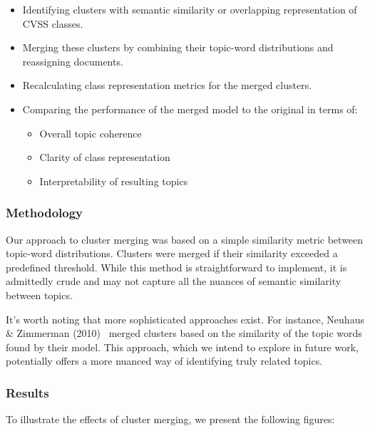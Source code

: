 \documentclass[12pt]{article}
\begin{document}
\begin{itemize}
	\item Identifying clusters with semantic similarity or overlapping representation of CVSS classes.
	\item Merging these clusters by combining their topic-word distributions and reassigning documents.
	\item Recalculating class representation metrics for the merged clusters.
	\item Comparing the performance of the merged model to the original in terms of:
	      \begin{itemize}
		      \item Overall topic coherence
		      \item Clarity of class representation
		      \item Interpretability of resulting topics
	      \end{itemize}
\end{itemize}

\subsubsection{Methodology}

Our approach to cluster merging was based on a simple similarity metric between topic-word distributions. Clusters were merged if their similarity exceeded a predefined threshold. While this method is straightforward to implement, it is admittedly crude and may not capture all the nuances of semantic similarity between topics.

It's worth noting that more sophisticated approaches exist. For instance, Neuhaus \& Zimmerman (2010)~\cite{cve_topic_modelling} merged clusters based on the similarity of the topic words found by their model. This approach, which we intend to explore in future work, potentially offers a more nuanced way of identifying truly related topics.

\subsubsection{Results}

To illustrate the effects of cluster merging, we present the following figures:

\end{document}
